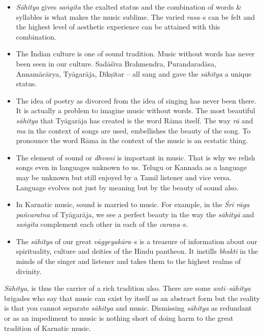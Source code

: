 \begin{itemize}
\itemsep=0pt
\item \textit{Sāhitya} gives \textit{saṅgīta} the exalted status and the combination of words \& syllables is what makes the music sublime. The varied \textit{rasa}–s can be felt and the highest level of aesthetic experience can be attained with this combination.

 \item The Indian culture is one of sound tradition. Music without words has never been seen in our culture. Sadāśiva Brahmendra, Purandaradāsa, Annamācārya, Tyāgarāja, Dīkṣitar – all sang and gave the \textit{sāhitya} a unique status. 

 \item The idea of poetry as divorced from the idea of singing has never been there. It is actually a problem to imagine music without words. The most beautiful \textit{sāhitya} that Tyāgarāja has created is the word Rāma itself. The way \textit{rā} and \textit{ma} in the context of songs are used, embellishes the beauty of the song. To pronounce the word Rāma in the context of the music is an ecstatic thing.

 \item The element of sound or \textit{dhvani} is important in music. That is why we relish songs even in languages unknown to us. Telugu or Kannada as a language may be unknown but still enjoyed by a Tamil listener and vice versa. Language evolves not just by meaning but by the beauty of sound also. 

 \item In Karnatic music, sound is married to music. For example, in the \textit{Śrī rāga pañcaratna} of Tyāgarāja, we see a perfect beauty in the way the \textit{sāhityā} and \textit{saṅgīta} complement each other in each of the \textit{caraṇa}–s.

 \item The \textit{sāhitya} of our great \textit{vāggeyakāra}–s is a treasure of information about our spirituality, culture and deities of the Hindu pantheon. It instills \textit{bhakti} in the minds of the singer and listener and takes them to the highest realms of divinity.

\end{itemize}

\textit{Sāhitya}, is thus the carrier of a rich tradition also. There are some \textit{anti–sāhitya} brigades who say that music can exist by itself as an abstract form but the reality is that you cannot separate \textit{sāhitya} and music. Dismissing \textit{sāhitya} as redundant or as an impediment to music is nothing short of doing harm to the great tradition of Karnatic music.

